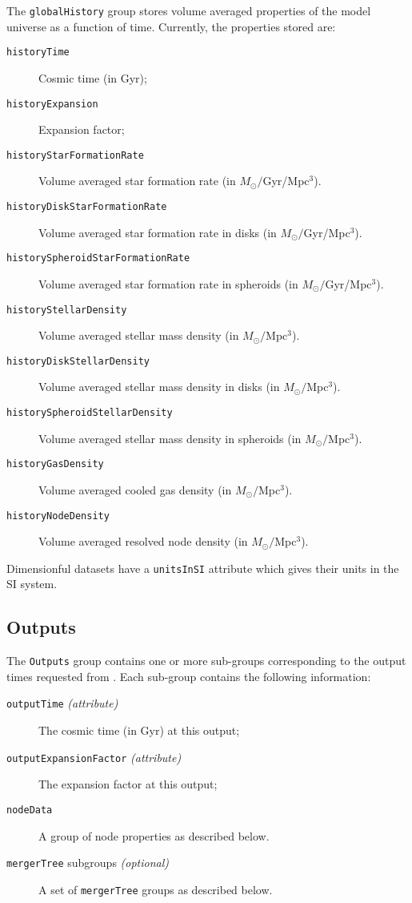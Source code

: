The {\tt globalHistory} group stores volume averaged properties of the model universe as a function of time. Currently, the properties stored are:
\begin{description}
 \item[{\tt historyTime}] Cosmic time (in Gyr);
 \item[{\tt historyExpansion}] Expansion factor;
 \item[{\tt historyStarFormationRate}] Volume averaged star formation rate (in $M_\odot/$Gyr/Mpc$^3$).
 \item[{\tt historyDiskStarFormationRate}] Volume averaged star formation rate in disks (in $M_\odot/$Gyr/Mpc$^3$).
 \item[{\tt historySpheroidStarFormationRate}] Volume averaged star formation rate in spheroids (in $M_\odot/$Gyr/Mpc$^3$).
 \item[{\tt historyStellarDensity}] Volume averaged stellar mass density (in $M_\odot/$Mpc$^3$).
 \item[{\tt historyDiskStellarDensity}] Volume averaged stellar mass density in disks (in $M_\odot/$Mpc$^3$).
 \item[{\tt historySpheroidStellarDensity}] Volume averaged stellar mass density in spheroids (in $M_\odot/$Mpc$^3$).
 \item[{\tt historyGasDensity}] Volume averaged cooled gas density (in $M_\odot/$Mpc$^3$).
 \item[{\tt historyNodeDensity}] Volume averaged resolved node density (in $M_\odot/$Mpc$^3$).
\end{description}
Dimensionful datasets have a {\tt unitsInSI} attribute which gives their units in the SI system.

\subsection{Outputs}

The {\tt Outputs} group contains one or more sub-groups corresponding to the output times requested from \glc. Each sub-group contains the following information:
\begin{description}
 \item[{\tt outputTime} \emph{(attribute)}] The cosmic time (in Gyr) at this output;
 \item[{\tt outputExpansionFactor} \emph{(attribute)}] The expansion factor at this output;
 \item[{\tt nodeData}] A group of node properties as described below.
 \item[{\tt mergerTree} subgroups \emph{(optional)}] A set of {\tt mergerTree} groups as described below.
\end{description}

